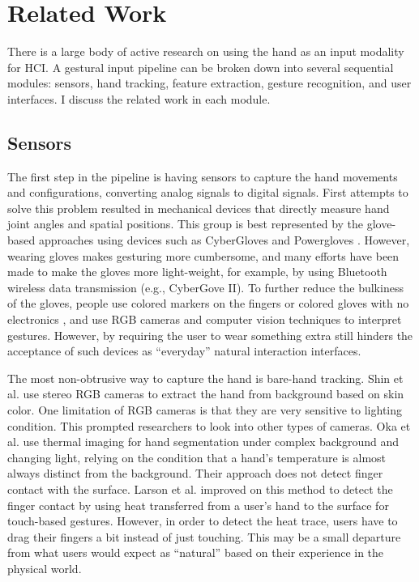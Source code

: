 \chapter{Related Work}
There is a large body of active research on using the hand as an input modality
for HCI.  A gestural input
pipeline can be broken down into several sequential modules: sensors, hand
tracking, feature extraction, gesture recognition, and user interfaces.
I discuss the related work in each module.

\section{Sensors}
The first step in the pipeline is having sensors to capture the hand movements
and configurations, converting analog signals to digital signals. First attempts
to solve this problem resulted in mechanical devices that directly measure hand
joint angles and spatial positions. This group is best represented by the
glove-based approaches using devices such as CyberGloves \cite{fels09} and
Powergloves \cite{kadous02}. However, wearing gloves makes gesturing more
cumbersome, and many efforts have been made to make the gloves more
light-weight, for example, by using Bluetooth wireless data transmission (e.g.,
CyberGove II). To further reduce the bulkiness of the gloves, people use colored
markers on the fingers \cite{mistry09} or colored gloves with no electronics \cite{Wang09}, and use RGB
cameras and computer vision techniques to interpret gestures. However, by
requiring the user to wear something extra still hinders the acceptance of
such devices as ``everyday'' natural interaction interfaces. 

The most non-obtrusive way to capture the hand is bare-hand tracking. Shin et
al. \cite{shin04} use stereo RGB cameras to extract the hand from background
based on skin color. One limitation of RGB cameras is that they are very sensitive to lighting
condition. This prompted researchers to look into other types of cameras. Oka et al. 
\cite{Oka02} use thermal imaging for hand segmentation under complex
background and changing light, relying on the condition that a hand's
temperature is almost always distinct from the background. Their approach does
not detect finger contact with the surface. Larson et al. \cite{larson11}
improved on this method to detect the finger contact by using
heat transferred from a user's hand to the surface for touch-based gestures.
However, in order to detect the heat trace, users have to drag their fingers a
bit instead of just touching. This may be a small departure from what users
would expect as ``natural'' based on their experience in the physical world.

